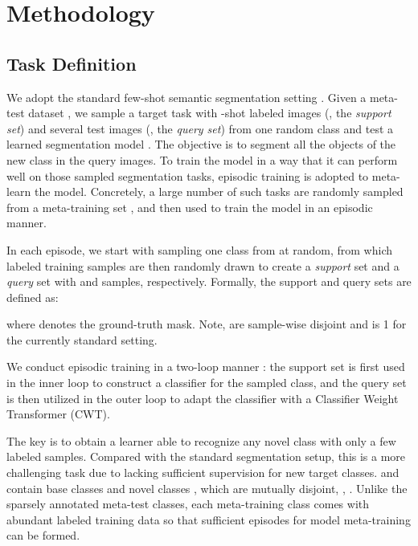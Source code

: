 \documentclass[10pt,twocolumn,letterpaper]{article}
\begin{document}
\section{Methodology}

\subsection{Task Definition}
We adopt the standard few-shot semantic segmentation setting \cite{shaban2017one,cao2020few}.
Given a meta-test dataset ,
we sample a target task with -shot labeled images (\ie, the {\em support set}) and several test images (\ie, the {\em query set}) from one random class
and test a learned segmentation model .
The objective is to segment all the objects of the new class in the query images. 
To train the model  in a way that
it can perform well on those sampled segmentation tasks,
episodic training is adopted to meta-learn the model.
Concretely, a large number of such tasks are randomly sampled 
from a meta-training set ,
and then used to train the model in an episodic manner.


In each episode, we start with sampling one class 
from  at random,
from which labeled training samples are then randomly drawn
to create a {\em support} set 
and a {\em query} set  with
 and  samples, respectively.
Formally, the support and query sets are defined as:

where  denotes the ground-truth mask.
Note,  are sample-wise disjoint and  is 1 for the currently standard setting.


We conduct episodic training in a two-loop manner \cite{snell2017prototypical}:
the support set is first used in the inner loop to construct a classifier for the sampled class,
and the query set is then utilized in the outer loop to adapt the classifier with a Classifier Weight Transformer (CWT).

The key is to obtain a learner able to recognize any novel class with only a few labeled samples.
Compared with the standard segmentation setup, this is a more challenging task due to lacking sufficient supervision for new target classes. 
 and 
contain base classes  and novel classes , 
which are mutually disjoint, \ie,
.
Unlike the sparsely annotated meta-test classes, 
each meta-training class comes with abundant labeled training data so that sufficient episodes for model meta-training can be formed.
\end{document}
